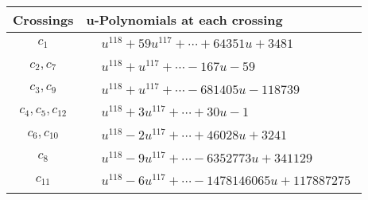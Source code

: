 \documentclass[1p]{elsarticle_modified}
\theoremstyle{definition}
\begin{document}
\begin{tabular}{m{50pt}|m{274pt}}
Crossings & \hspace{64pt}u-Polynomials at each crossing \\
\hline $$\begin{aligned}c_{1}\end{aligned}$$&$\begin{aligned}
&u^{118}+59 u^{117}+\cdots+64351 u+3481
\end{aligned}$\\
\hline $$\begin{aligned}c_{2},c_{7}\end{aligned}$$&$\begin{aligned}
&u^{118}+u^{117}+\cdots-167 u-59
\end{aligned}$\\
\hline $$\begin{aligned}c_{3},c_{9}\end{aligned}$$&$\begin{aligned}
&u^{118}+u^{117}+\cdots-681405 u-118739
\end{aligned}$\\
\hline $$\begin{aligned}c_{4},c_{5},c_{12}\end{aligned}$$&$\begin{aligned}
&u^{118}+3 u^{117}+\cdots+30 u-1
\end{aligned}$\\
\hline $$\begin{aligned}c_{6},c_{10}\end{aligned}$$&$\begin{aligned}
&u^{118}-2 u^{117}+\cdots+46028 u+3241
\end{aligned}$\\
\hline $$\begin{aligned}c_{8}\end{aligned}$$&$\begin{aligned}
&u^{118}-9 u^{117}+\cdots-6352773 u+341129
\end{aligned}$\\
\hline $$\begin{aligned}c_{11}\end{aligned}$$&$\begin{aligned}
&u^{118}-6 u^{117}+\cdots-1478146065 u+117887275
\end{aligned}$\\
\hline
\end{tabular}\\~\\
\end{document}
